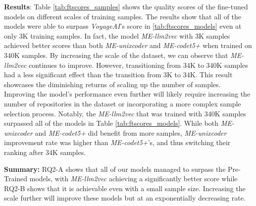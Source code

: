 \textbf{Results}: Table \ref{tab:ftscores_samples} shows the quality scores of the fine-tuned models on different scales of training samples. The results show that all of the models were able to surpass \textit{VoyageAI}'s score in \ref{tab:ftscores_models} even at only 3K training samples. In fact, the model \textit{ME-llm2vec} with 3K samples achieved better scores than both \textit{ME-unixcoder} and \textit{ME-codet5+} when trained on 340K samples. By increasing the scale of the dataset, we can observe that \textit{ME-llm2vec} continues to improve. However, transitioning from 34K to 340K samples had a less significant effect than the transition from 3K to 34K. This result showcases the diminishing returns of scaling up the number of samples. Improving the model's performance even further will likely require increasing the number of repositories in the dataset or incorporating a more complex sample selection process. Notably, the \textit{ME-llm2vec} that was trained with 340K samples surpassed all of the models in Table \ref{tab:ftscores_models}. While both \textit{ME-unixcoder} and \textit{ME-codet5+} did benefit from more samples, \textit{ME-unixcoder} improvement rate was higher than \textit{ME-codet5+}'s, and thus switching their ranking after 34K samples. 


\begin{tcolorbox}[colback=gray!10!white, colframe=gray!90!black]
\textbf{Summary:} RQ2-A shows that all of our models managed to surpass the Pre-Trained models, with \textit{ME-llm2vec} achieving a significantly better score while RQ2-B shows that it is achievable even with a small sample size. Increasing the scale further will improve these models but at an exponentially decreasing rate. 
\end{tcolorbox} 

